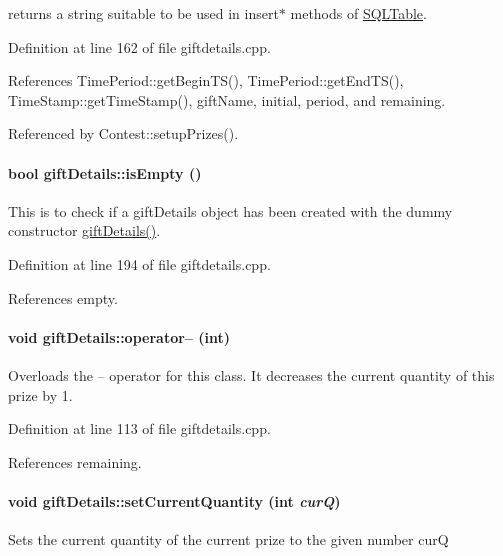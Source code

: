 returns a string suitable to be used in insert$\ast$ methods of \hyperlink{classSQLTable}{SQLTable}. 

Definition at line 162 of file giftdetails.cpp.

References Time\-Period::get\-Begin\-TS(), Time\-Period::get\-End\-TS(), Time\-Stamp::get\-Time\-Stamp(), gift\-Name, initial, period, and remaining.

Referenced by Contest::setup\-Prizes().\hypertarget{classgiftDetails_giftDetailsa14}{
\paragraph[isEmpty]{\setlength{\rightskip}{0pt plus 5cm}bool gift\-Details::is\-Empty ()}\hfill}
\label{classgiftDetails_giftDetailsa14}


This is to check if a gift\-Details object has been created with the dummy constructor \hyperlink{classgiftDetails_giftDetailsa0}{gift\-Details()}. 

Definition at line 194 of file giftdetails.cpp.

References empty.\hypertarget{classgiftDetails_giftDetailsa9}{
\paragraph[operator--]{\setlength{\rightskip}{0pt plus 5cm}void gift\-Details::operator-- (int)}\hfill}
\label{classgiftDetails_giftDetailsa9}


Overloads the -- operator for this class. It decreases the current quantity of this prize by 1. 

Definition at line 113 of file giftdetails.cpp.

References remaining.\hypertarget{classgiftDetails_giftDetailsa8}{
\paragraph[setCurrentQuantity]{\setlength{\rightskip}{0pt plus 5cm}void gift\-Details::set\-Current\-Quantity (int {\em cur\-Q})}\hfill}
\label{classgiftDetails_giftDetailsa8}


Sets the current quantity of the current prize to the given number cur\-Q 

